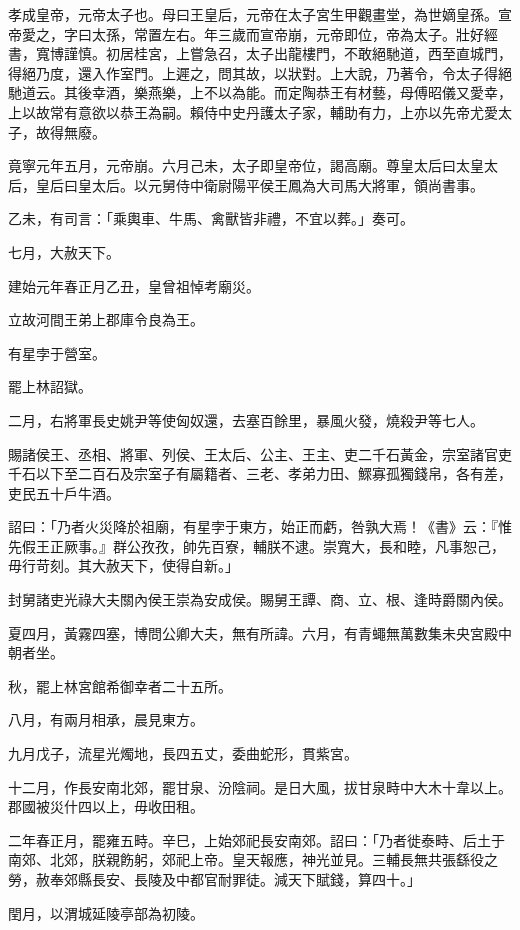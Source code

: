 
\begin{pinyinscope}
孝成皇帝，元帝太子也。母曰王皇后，元帝在太子宮生甲觀畫堂，為世嫡皇孫。宣帝愛之，字曰太孫，常置左右。年三歲而宣帝崩，元帝即位，帝為太子。壯好經書，寬博謹慎。初居桂宮，上嘗急召，太子出龍樓門，不敢絕馳道，西至直城門，得絕乃度，還入作室門。上遲之，問其故，以狀對。上大說，乃著令，令太子得絕馳道云。其後幸酒，樂燕樂，上不以為能。而定陶恭王有材藝，母傅昭儀又愛幸，上以故常有意欲以恭王為嗣。賴侍中史丹護太子家，輔助有力，上亦以先帝尤愛太子，故得無廢。

竟寧元年五月，元帝崩。六月己未，太子即皇帝位，謁高廟。尊皇太后曰太皇太后，皇后曰皇太后。以元舅侍中衛尉陽平侯王鳳為大司馬大將軍，領尚書事。

乙未，有司言：「乘輿車、牛馬、禽獸皆非禮，不宜以葬。」奏可。

七月，大赦天下。

建始元年春正月乙丑，皇曾祖悼考廟災。

立故河間王弟上郡庫令良為王。

有星孛于營室。

罷上林詔獄。

二月，右將軍長史姚尹等使匈奴還，去塞百餘里，暴風火發，燒殺尹等七人。

賜諸侯王、丞相、將軍、列侯、王太后、公主、王主、吏二千石黃金，宗室諸官吏千石以下至二百石及宗室子有屬籍者、三老、孝弟力田、鰥寡孤獨錢帛，各有差，吏民五十戶牛酒。

詔曰：「乃者火災降於祖廟，有星孛于東方，始正而虧，咎孰大焉！《書》云：『惟先假王正厥事。』群公孜孜，帥先百寮，輔朕不逮。崇寬大，長和睦，凡事恕己，毋行苛刻。其大赦天下，使得自新。」

封舅諸吏光祿大夫關內侯王崇為安成侯。賜舅王譚、商、立、根、逢時爵關內侯。

夏四月，黃霧四塞，博問公卿大夫，無有所諱。六月，有青蠅無萬數集未央宮殿中朝者坐。

秋，罷上林宮館希御幸者二十五所。

八月，有兩月相承，晨見東方。

九月戊子，流星光燭地，長四五丈，委曲蛇形，貫紫宮。

十二月，作長安南北郊，罷甘泉、汾陰祠。是日大風，拔甘泉畤中大木十韋以上。郡國被災什四以上，毋收田租。

二年春正月，罷雍五畤。辛巳，上始郊祀長安南郊。詔曰：「乃者徙泰畤、后土于南郊、北郊，朕親飭躬，郊祀上帝。皇天報應，神光並見。三輔長無共張繇役之勞，赦奉郊縣長安、長陵及中都官耐罪徒。減天下賦錢，算四十。」

閏月，以渭城延陵亭部為初陵。


\end{pinyinscope}
